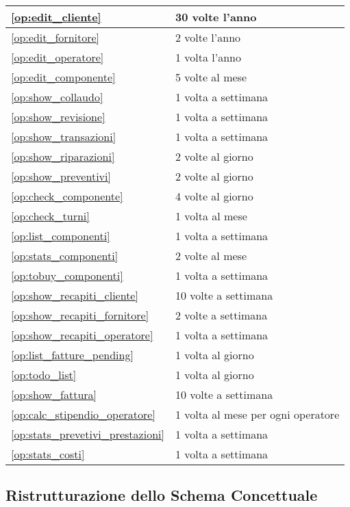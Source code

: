 \begin{longtable}{| p{6.2cm} | p{6.2cm} |}
				\ref{op:edit_cliente} & 30 volte l'anno \\ \hline
				\ref{op:edit_fornitore} & 2 volte l'anno \\ \hline
				\ref{op:edit_operatore} & 1 volta l'anno \\ \hline
				\ref{op:edit_componente} & 5 volte al mese \\ \hline

				\ref{op:show_collaudo} & 1 volta a settimana \\ \hline
				\ref{op:show_revisione} & 1 volta a settimana \\ \hline
				\ref{op:show_transazioni} & 1 volta a settimana \\ \hline
				\ref{op:show_riparazioni} & 2 volte al giorno \\ \hline
				\ref{op:show_preventivi} & 2 volte al giorno \\ \hline
				\ref{op:check_componente} & 4 volte al giorno \\ \hline
				\ref{op:check_turni} & 1 volta al mese \\ \hline
				\ref{op:list_componenti} & 1 volta a settimana \\ \hline
				\ref{op:stats_componenti} & 2 volte al mese \\ \hline
				\ref{op:tobuy_componenti} & 1 volta a settimana \\ \hline
				\ref{op:show_recapiti_cliente} & 10 volte a settimana \\ \hline
				\ref{op:show_recapiti_fornitore} & 2 volte a settimana \\ \hline
				\ref{op:show_recapiti_operatore} & 1 volta a settimana \\ \hline
				\ref{op:list_fatture_pending} & 1 volta al giorno \\ \hline
				\ref{op:todo_list} & 1 volta al giorno \\ \hline
				\ref{op:show_fattura} & 10 volte a settimana \\ \hline
				\ref{op:calc_stipendio_operatore} & 1 volta al mese per ogni operatore \\\hline
				\ref{op:stats_prevetivi_prestazioni} & 1 volta a settimana \\ \hline
				\ref{op:stats_costi} & 1 volta a settimana \\ \hline

			\end{longtable}
			
	\subsection{Ristrutturazione dello Schema Concettuale}


